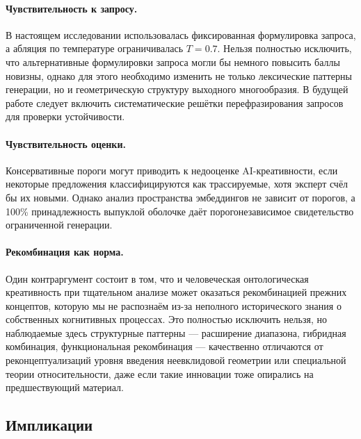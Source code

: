 \documentclass[sn-mathphys-num]{sn-jnl}
\begin{document}
\paragraph{Чувствительность к запросу.} В настоящем исследовании использовалась фиксированная формулировка запроса, а абляция по температуре ограничивалась $T=0.7$. Нельзя полностью исключить, что альтернативные формулировки запроса могли бы немного повысить баллы новизны, однако для этого необходимо изменить не только лексические паттерны генерации, но и геометрическую структуру выходного многообразия. В будущей работе следует включить систематические решётки перефразирования запросов для проверки устойчивости.

\paragraph{Чувствительность оценки.} Консервативные пороги могут приводить к недооценке AI-креативности, если некоторые предложения классифицируются как трассируемые, хотя эксперт счёл бы их новыми. Однако анализ пространства эмбеддингов не зависит от порогов, а 100\% принадлежность выпуклой оболочке даёт порогонезависимое свидетельство ограниченной генерации.

\paragraph{Рекомбинация как норма.} Один контраргумент состоит в том, что и человеческая онтологическая креативность при тщательном анализе может оказаться рекомбинацией прежних концептов, которую мы не распознаём из-за неполного исторического знания о собственных когнитивных процессах. Это полностью исключить нельзя, но наблюдаемые здесь структурные паттерны --- расширение диапазона, гибридная комбинация, функциональная рекомбинация --- качественно отличаются от реконцептуализаций уровня введения неевклидовой геометрии или специальной теории относительности, даже если такие инновации тоже опирались на предшествующий материал.

\subsection{Импликации}
\end{document}
